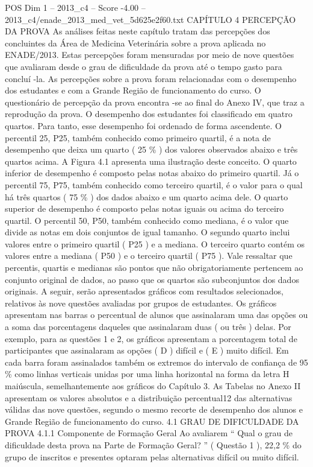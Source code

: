 \begin{textsample}{POS Dim 1 – 2013\_c4 – Score -4.00 – 2013\_c4/enade\_2013\_med\_vet\_5d625e2f60.txt}  \label{ex:f1_pos_383}
CAPÍTULO 4 PERCEPÇÃO DA PROVA As análises feitas neste capítulo tratam das percepções dos concluintes da Área de Medicina Veterinária sobre a prova aplicada no ENADE/2013.
Estas percepções foram mensuradas por meio de nove questões que avaliaram desde o grau de dificuldade da prova até o tempo gasto para concluí -la.
As percepções sobre a prova foram relacionadas com o desempenho dos estudantes e com a Grande Região de funcionamento do curso.
O questionário de percepção da prova encontra -se ao final do Anexo IV, que traz a reprodução da prova.
O desempenho dos estudantes foi classificado em quatro quartos.
Para tanto, esse desempenho foi ordenado de forma ascendente.
O percentil 25, P25, também conhecido como primeiro quartil, é a nota de desempenho que deixa um quarto ( 25 \% ) dos valores observados abaixo e três quartos acima.
A Figura 4.1 apresenta uma ilustração deste conceito.
O quarto inferior de desempenho é composto pelas notas abaixo do primeiro quartil.
Já o percentil 75, P75, também conhecido como terceiro quartil, é o valor para o qual há três quartos ( 75 \% ) dos dados abaixo e um quarto acima dele.
O quarto superior de desempenho é composto pelas notas iguais ou acima do terceiro quartil.
O percentil 50, P50, também conhecido como mediana, é o valor que divide as notas em dois conjuntos de igual tamanho.
O segundo quarto inclui valores entre o primeiro quartil ( P25 ) e a mediana.
O terceiro quarto contém os valores entre a mediana ( P50 ) e o terceiro quartil ( P75 ).
Vale ressaltar que percentis, quartis e medianas são pontos que não obrigatoriamente pertencem ao conjunto original de dados, ao passo que os quartos são subconjuntos dos dados originais.
A seguir, serão apresentados gráficos com resultados selecionados, relativos às nove questões avaliadas por grupos de estudantes.
Os gráficos apresentam nas barras o percentual de alunos que assinalaram uma das opções ou a soma das porcentagens daqueles que assinalaram duas ( ou três ) delas.
Por exemplo, para as questões 1 e 2, os gráficos apresentam a porcentagem total de participantes que assinalaram as opções ( D ) difícil e ( E ) muito difícil.
Em cada barra foram assinalados também os extremos do intervalo de confiança de 95 \% como linhas verticais unidas por uma linha horizontal na forma da letra H maiúscula, semelhantemente aos gráficos do Capítulo 3.
As Tabelas no Anexo II apresentam os valores absolutos e a distribuição percentual12 das alternativas válidas das nove questões, segundo o mesmo recorte de desempenho dos alunos e Grande Região de funcionamento do curso. 4.1 GRAU DE DIFICULDADE DA PROVA 4.1.1 Componente de Formação Geral Ao avaliarem “ Qual o grau de dificuldade desta prova na Parte de Formação Geral? ” ( Questão 1 ), 22,2 \% do grupo de inscritos e presentes optaram pelas alternativas difícil ou muito difícil.

\end{textsample}
